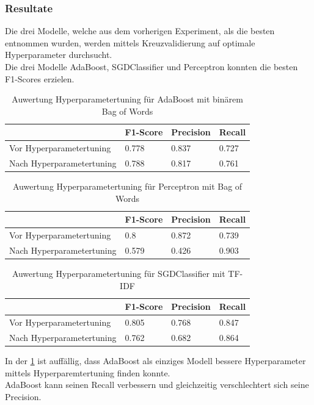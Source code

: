 \subsubsection{Resultate}
Die drei Modelle, welche aus dem vorherigen Experiment, als die besten entnommen wurden, werden mittels Kreuzvalidierung auf optimale Hyperparameter durchsucht.\\
Die drei Modelle AdaBoost, SGDClassifier und Perceptron konnten die besten F1-Scores erzielen.\\
\begin{table}[H]
	\caption{Auwertung Hyperparametertuning für AdaBoost mit binärem Bag of Words}
	\centering
	\label{tab:ada}
	\begin{tabular}{|l|l|l|l|}
		\hline
		& F1-Score & Precision & Recall\\
		\hline
		Vor Hyperparametertuning & 0.778 & 0.837 & 0.727 \\
		Nach Hyperparametertuning & 0.788 & 0.817 & 0.761 \\
		\hline
	\end{tabular}
\end{table}
\begin{table}[H]
	\caption{Auwertung Hyperparametertuning für Perceptron mit Bag of Words}
	\centering
	\label{tab:per}
	\begin{tabular}{|l|l|l|l|}
		\hline
		& F1-Score & Precision & Recall\\
		\hline
		Vor Hyperparametertuning & 0.8 & 0.872 & 0.739 \\
		Nach Hyperparametertuning & 0.579 & 0.426 & 0.903 \\
		\hline
	\end{tabular}
\end{table}
\begin{table}[H]
	\caption{Auwertung Hyperparametertuning für SGDClassifier mit TF-IDF}
	\centering
	\label{tab:sgd}
	\begin{tabular}{|l|l|l|l|}
		\hline
		& F1-Score & Precision & Recall\\
		\hline
		Vor Hyperparametertuning & 0.805 & 0.768 & 0.847 \\
		Nach Hyperparametertuning & 0.762 & 0.682 & 0.864 \\
		\hline
	\end{tabular}
\end{table}
In der \cref{tab:ada} ist auffällig, dass AdaBoost als einziges Modell bessere Hyperparameter mittels Hyperparemtertuning finden konnte.\\
AdaBoost kann seinen Recall verbessern und gleichzeitig verschlechtert sich seine Precision.
